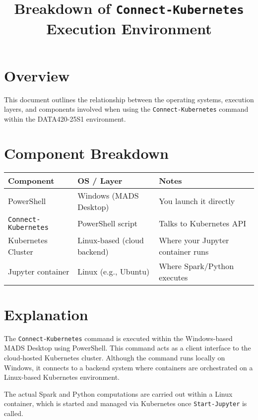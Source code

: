\documentclass{article}
\title{Breakdown of \texttt{Connect-Kubernetes} Execution Environment}
\author{}
\date{}
\begin{document}
\maketitle

\section*{Overview}

This document outlines the relationship between the operating systems, execution layers, and components involved when using the \texttt{Connect-Kubernetes} command within the DATA420-25S1 environment.

\section*{Component Breakdown}

\begin{longtable}{@{}lll@{}}
\toprule
\textbf{Component} & \textbf{OS / Layer} & \textbf{Notes} \\
\midrule
PowerShell & Windows (MADS Desktop) & You launch it directly \\
\texttt{Connect-Kubernetes} & PowerShell script & Talks to Kubernetes API \\
Kubernetes Cluster & Linux-based (cloud backend) & Where your Jupyter container runs \\
Jupyter container & Linux (e.g., Ubuntu) & Where Spark/Python executes \\
\bottomrule
\end{longtable}

\section*{Explanation}

The \texttt{Connect-Kubernetes} command is executed within the Windows-based MADS Desktop using PowerShell. This command acts as a client interface to the cloud-hosted Kubernetes cluster. Although the command runs locally on Windows, it connects to a backend system where containers are orchestrated on a Linux-based Kubernetes environment.

The actual Spark and Python computations are carried out within a Linux container, which is started and managed via Kubernetes once \texttt{Start-Jupyter} is called.
\end{document}
